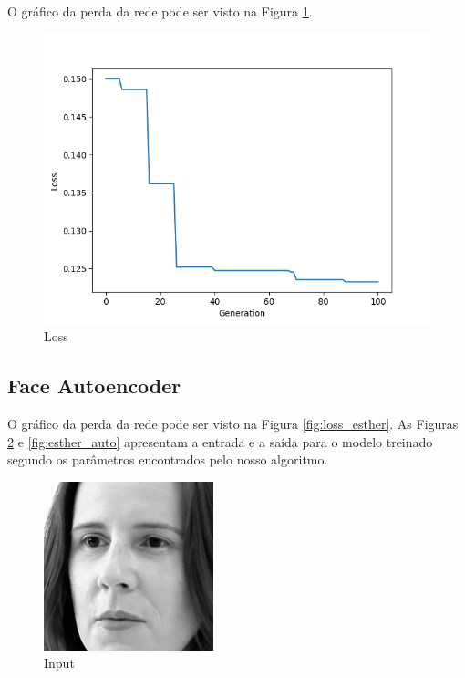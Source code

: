 \documentclass[twoside,conference,a4paper]{IEEEtran}
\begin{document}
O gráfico da perda da rede pode ser visto na Figura \ref{fig:loss_mnist_autoencoder}.

\begin{figure}[htbp]
        \centering \includegraphics[width=1\columnwidth]{./ia_proj_images/mnist_auto_encoder/config_inicial_fixed_epochs_loss.png}
        \caption{
                \label{fig:loss_mnist_autoencoder}
                Loss
        }
\end{figure}

\subsection{Face Autoencoder}

O gráfico da perda da rede pode ser visto na Figura \ref{fig:loss_esther}.
As Figuras \ref{fig:esther} e \ref{fig:esther_auto} apresentam a entrada e a saída para o modelo treinado segundo os parâmetros encontrados pelo nosso algoritmo.\\

\begin{figure}[htbp]
        \centering \includegraphics[width=.7\columnwidth]{./ia_proj_images/faces_auto_encoder/esther.jpg}
        \caption{
                \label{fig:esther}
                Input
        }
\end{figure}
\end{document}
